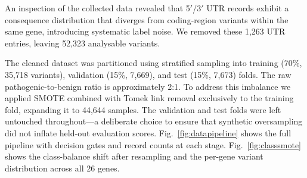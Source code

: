 \documentclass[12pt,a4paper]{article}
\begin{document}
An inspection of the collected data revealed that 5$'$/3$'$ UTR
records exhibit a consequence distribution that diverges from
coding-region variants within the same gene, introducing
systematic label noise. We removed these 1,263 UTR entries,
leaving 52,323 analysable variants.

The cleaned dataset was partitioned using stratified sampling into
training (70\%, 35,718 variants), validation (15\%, 7,669), and
test (15\%, 7,673) folds. The raw pathogenic-to-benign ratio is
approximately 2:1. To address this imbalance we applied SMOTE
combined with Tomek link removal exclusively to the training fold,
expanding it to 44,644 samples. The validation and test folds
were left untouched throughout---a deliberate choice to ensure
that synthetic oversampling did not inflate held-out evaluation
scores. Fig.~\ref{fig:datapipeline} shows the full pipeline
with decision gates and record counts at each stage.
Fig.~\ref{fig:classsmote} shows the class-balance shift after
resampling and the per-gene variant distribution across all 26
genes.
\end{document}
